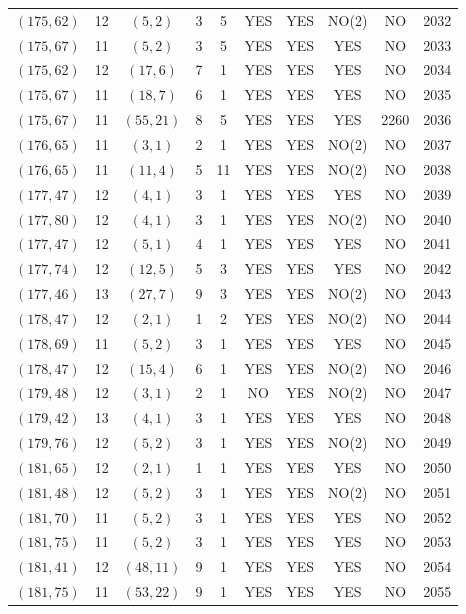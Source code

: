 \begin{longtable}{|c|c|c|c|c|c|c|c|c|c|}
$(175, 62)$ & 12 & $(5, 2)$ & 3 & 5 & YES & YES & NO(2) & NO & 2032\\
$(175, 67)$ & 11 & $(5, 2)$ & 3 & 5 & YES & YES & YES & NO & 2033\\
$(175, 62)$ & 12 & $(17, 6)$ & 7 & 1 & YES & YES & YES & NO & 2034\\
$(175, 67)$ & 11 & $(18, 7)$ & 6 & 1 & YES & YES & YES & NO & 2035\\
$(175, 67)$ & 11 & $(55, 21)$ & 8 & 5 & YES & YES & YES & 2260 & 2036\\
$(176, 65)$ & 11 & $(3, 1)$ & 2 & 1 & YES & YES & NO(2) & NO & 2037\\
$(176, 65)$ & 11 & $(11, 4)$ & 5 & 11 & YES & YES & NO(2) & NO & 2038\\
$(177, 47)$ & 12 & $(4, 1)$ & 3 & 1 & YES & YES & YES & NO & 2039\\
$(177, 80)$ & 12 & $(4, 1)$ & 3 & 1 & YES & YES & NO(2) & NO & 2040\\
$(177, 47)$ & 12 & $(5, 1)$ & 4 & 1 & YES & YES & YES & NO & 2041\\
$(177, 74)$ & 12 & $(12, 5)$ & 5 & 3 & YES & YES & YES & NO & 2042\\
$(177, 46)$ & 13 & $(27, 7)$ & 9 & 3 & YES & YES & NO(2) & NO & 2043\\
$(178, 47)$ & 12 & $(2, 1)$ & 1 & 2 & YES & YES & NO(2) & NO & 2044\\
$(178, 69)$ & 11 & $(5, 2)$ & 3 & 1 & YES & YES & YES & NO & 2045\\
$(178, 47)$ & 12 & $(15, 4)$ & 6 & 1 & YES & YES & NO(2) & NO & 2046\\
$(179, 48)$ & 12 & $(3, 1)$ & 2 & 1 & NO & YES & NO(2) & NO & 2047\\
$(179, 42)$ & 13 & $(4, 1)$ & 3 & 1 & YES & YES & YES & NO & 2048\\
$(179, 76)$ & 12 & $(5, 2)$ & 3 & 1 & YES & YES & NO(2) & NO & 2049\\
$(181, 65)$ & 12 & $(2, 1)$ & 1 & 1 & YES & YES & YES & NO & 2050\\
$(181, 48)$ & 12 & $(5, 2)$ & 3 & 1 & YES & YES & NO(2) & NO & 2051\\
$(181, 70)$ & 11 & $(5, 2)$ & 3 & 1 & YES & YES & YES & NO & 2052\\
$(181, 75)$ & 11 & $(5, 2)$ & 3 & 1 & YES & YES & YES & NO & 2053\\
$(181, 41)$ & 12 & $(48, 11)$ & 9 & 1 & YES & YES & YES & NO & 2054\\
$(181, 75)$ & 11 & $(53, 22)$ & 9 & 1 & YES & YES & YES & NO & 2055\\

\end{longtable}
